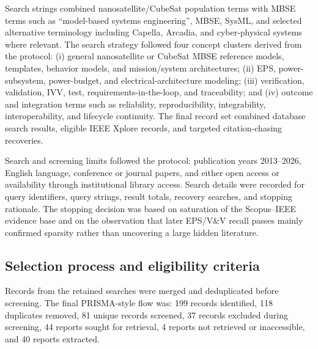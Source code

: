Search strings combined nanosatellite/CubeSat population terms with MBSE terms such as ``model-based systems engineering'', MBSE, SysML, and selected alternative terminology including Capella, Arcadia, and cyber-physical systems where relevant.  The search strategy followed four concept clusters derived from the protocol: (i) general nanosatellite or CubeSat MBSE reference models, templates, behavior models, and mission/system architectures; (ii) EPS, power-subsystem, power-budget, and electrical-architecture modeling; (iii) verification, validation, IVV, test, requirements-in-the-loop, and traceability; and (iv) outcome and integration terms such as reliability, reproducibility, integrability, interoperability, and lifecycle continuity.  The final record set combined database search results, eligible IEEE Xplore records, and targeted citation-chasing recoveries.

Search and screening limits followed the protocol: publication years 2013--2026, English language, conference or journal papers, and either open access or availability through institutional library access.  Search details were recorded for query identifiers, query strings, result totals, recovery searches, and stopping rationale.  The stopping decision was based on saturation of the Scopus--IEEE evidence base and on the observation that later EPS/V\&V recall passes mainly confirmed sparsity rather than uncovering a large hidden literature.

\subsection{Selection process and eligibility criteria}
Records from the retained searches were merged and deduplicated before screening.  The final PRISMA-style flow was: 199 records identified, 118 duplicates removed, 81 unique records screened, 37 records excluded during screening, 44 reports sought for retrieval, 4 reports not retrieved or inaccessible, and 40 reports extracted.

